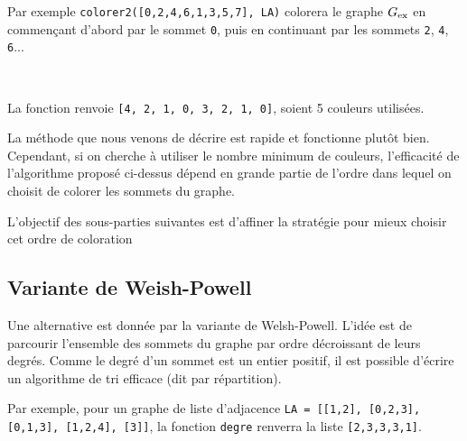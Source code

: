 Par exemple \lstinline{colorer2([0,2,4,6,1,3,5,7], LA)} colorera le graphe ${G}_{\text{ex}}$ en commençant d'abord par le sommet \lstinline{0}, puis en continuant par les sommets \lstinline{2}, \lstinline{4}, \lstinline{6}...
\ifprof
\begin{corrige}~\\ \vspace{-.5cm}

\end{corrige}
\else
\fi

\ifprof
\begin{corrige}
La fonction renvoie \lstinline{[4, 2, 1, 0, 3, 2, 1, 0]}, soient 5 couleurs utilisées. 
\end{corrige}
\else
\fi

\ifprof\else
La méthode que nous venons de décrire est rapide et fonctionne plutôt bien. Cependant, si on cherche à utiliser le nombre minimum de couleurs, l'efficacité de l'algorithme proposé ci-dessus dépend en grande partie de l'ordre dans lequel on choisit de colorer les sommets du graphe. 

L'objectif des sous-parties suivantes est d'affiner la stratégie pour mieux choisir cet ordre de coloration
\fi

\subsection{Variante de Weish-Powell}
\ifprof\else
Une alternative est donnée par la variante de Welsh-Powell. L'idée est de parcourir l'ensemble des sommets du graphe par ordre décroissant de leurs degrés.
Comme le degré d'un sommet est un entier positif, il est possible d'écrire un algorithme de tri efficace (dit par répartition).
\fi



Par exemple, pour un graphe de liste d'adjacence \lstinline{LA = [[1,2], [0,2,3], [0,1,3], [1,2,4], [3]]}, la fonction \lstinline{degre} renverra la liste \lstinline{[2,3,3,3,1]}.

\ifprof
\begin{corrige}~\\ \vspace{-.5cm}

\end{corrige}
\else
\fi

